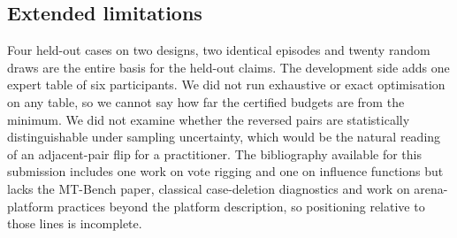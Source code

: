 \documentclass{article}
\begin{document}
\subsection{Extended limitations}
Four held-out cases on two designs, two identical episodes and twenty random draws are the entire basis for the held-out claims. The development side adds one expert table of six participants. We did not run exhaustive or exact optimisation on any table, so we cannot say how far the certified budgets are from the minimum. We did not examine whether the reversed pairs are statistically distinguishable under sampling uncertainty, which would be the natural reading of an adjacent-pair flip for a practitioner. The bibliography available for this submission includes one work on vote rigging and one on influence functions but lacks the MT-Bench paper, classical case-deletion diagnostics and work on arena-platform practices beyond the platform description, so positioning relative to those lines is incomplete.
\end{document}
